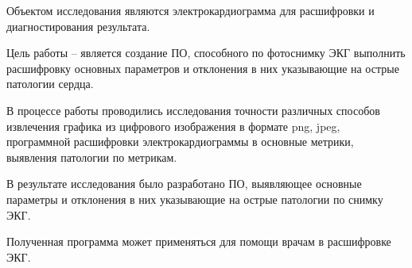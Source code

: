 \abstract %


Объектом исследования являются электрокардиограмма для расшифровки и диагностирования результата.

Цель работы – является создание ПО, способного по фотоснимку ЭКГ выполнить расшифровку основных параметров и отклонения в них указывающие на острые патологии сердца.

В процессе работы проводились исследования точности различных способов извлечения графика из цифрового изображения в формате png, jpeg, программной расшифровки электрокардиограммы в основные метрики, выявления патологии по метрикам.

В результате исследования было разработано ПО, выявляющее основные параметры и отклонения в них указывающие на острые патологии по снимку ЭКГ.

Полученная программа может применяться для помощи врачам в расшифровке ЭКГ.
